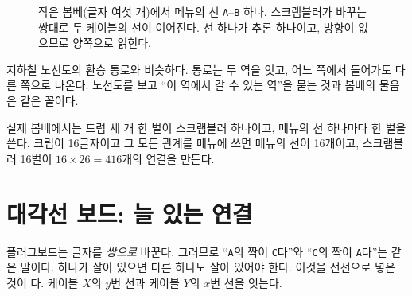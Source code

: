 \begin{figure}[ht]
\centering
{}
\caption{작은 봄베(글자 여섯 개)에서 메뉴의 선 \texttt{A}--\texttt{B} 하나. 스크램블러가 바꾸는 쌍대로 두 케이블의
선이 이어진다. 선 하나가 추론 하나이고, 방향이 없으므로 양쪽으로 읽힌다.}
\label{fig:c-scr}
\end{figure}

\General 지하철 노선도의 환승 통로와 비슷하다. 통로는 두 역을 잇고, 어느 쪽에서 들어가도 다른 쪽으로 나온다.
노선도를 보고 ``이 역에서 갈 수 있는 역''을 묻는 것과 봄베의 물음은 같은 꼴이다.

\Ours 실제 봄베에서는 드럼 세 개 한 벌이 스크램블러 하나이고, 메뉴의 선 하나마다 한 벌을 쓴다. 크립이 16글자이고
그 모든 관계를 메뉴에 쓰면 메뉴의 선이 16개이고, 스크램블러 16벌이 $16 \times 26 = 416$개의 연결을 만든다.

\section{대각선 보드: 늘 있는 연결}\label{sec:c-diagonal}

\Why 플러그보드는 글자를 \emph{쌍으로} 바꾼다. 그러므로 ``\texttt{A}의 짝이 \texttt{C}다''와 ``\texttt{C}의 짝이
\texttt{A}다''는 같은 말이다. 하나가 살아 있으면 다른 하나도 살아 있어야 한다. 이것을 전선으로 넣은 것이
다. 케이블 $X$의 $y$번 선과 케이블 $Y$의 $x$번 선을 잇는다.

